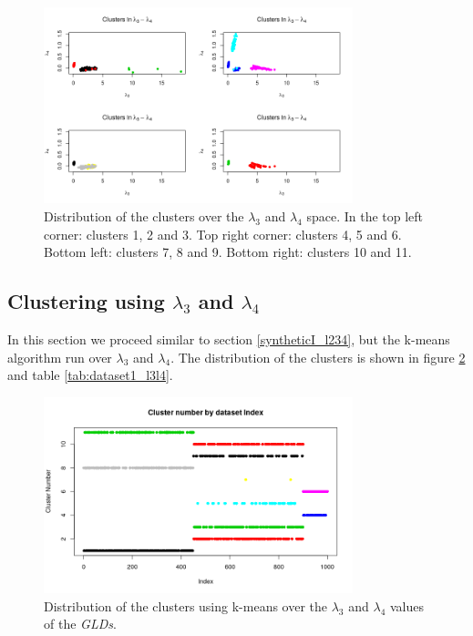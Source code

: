\begin{figure}[H]
    \centering
    \includegraphics[width=0.8\textwidth]{img/gld_clustering/Dataset1/l2_l3_l4/intento_3/l3_l4_dividido.png}
    \caption{Distribution of the clusters over the $\lambda_{3}$ and $\lambda_{4}$ space. In the top left corner: clusters 1, 2 and 3. Top right corner: clusters 4, 5 and 6. Bottom left: clusters 7, 8 and 9. Bottom right: clusters 10 and 11.}
    \label{fig:dataset1_l2l3l4_l3_l4_dividido}
\end{figure}

\subsection{Clustering using $\lambda_{3}$ and $\lambda_{4}$}\label{syntheticI_l34}

In this section we proceed similar to section \ref{syntheticI_l234}, but the k-means algorithm run over $\lambda_{3}$ and $\lambda_{4}$. The distribution of the clusters is shown in figure \ref{fig:dataset1_l3l4} and table \ref{tab:dataset1_l3l4}.

\begin{figure}[H]
    \centering
    \includegraphics[width=0.8\textwidth]{img/gld_clustering/Dataset1/l3_l4/clusters_by_index.png}
    \caption{Distribution of the clusters using k-means over the $\lambda_{3}$ and $\lambda_{4}$ values of the \textit{GLDs}.}
    \label{fig:dataset1_l3l4}
\end{figure}

